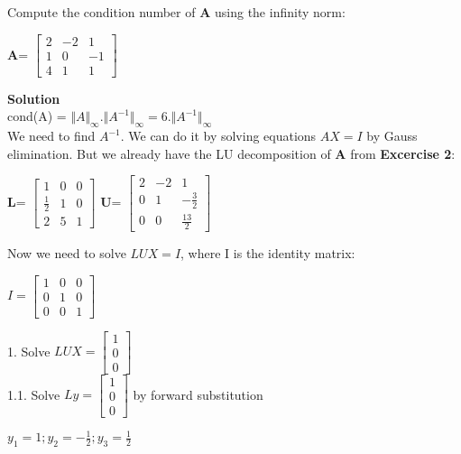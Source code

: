 \documentclass[12pt]{article}
\newenvironment{exercise}[2][Exercise]{\begin{trivlist}
\item[\hskip \labelsep {\bfseries #1}\hskip \labelsep {\bfseries #2.}]}{\end{trivlist}}
\begin{document}
\begin{exercise}{5} %
Compute the condition number of $\textbf{A}$ using the infinity norm:
\begin{center}
\textbf{A}=
$\begin{bmatrix}
2&-2&1\\
1&0&-1\\
4&1&1
\end{bmatrix}
$
\end{center}
\textbf{Solution}\\

cond(A) = $\Vert A \Vert_\infty . \Vert A^{-1} \Vert_\infty = 6 . \Vert A^{-1} \Vert_\infty$ \\
We need to find $A^{-1}$. We can do it by solving equations $AX = I$ by Gauss elimination. But we already have the LU decomposition of \textbf{A} from \textbf{Excercise 2}:
\begin{center}
\textbf{L}=
$\begin{bmatrix}
1&0&0\\
\frac{1}{2}&1&0\\
2&5&1
\end{bmatrix}
$
\textbf{U}=
$\begin{bmatrix}
2&-2&1\\
0&1&-\frac{3}{2}\\
0&0&\frac{13}{2}
\end{bmatrix}
$
\end{center}
Now we need to solve $LUX = I$, where I is the identity matrix:
\begin{center}
$ I = \begin{bmatrix}
1&0&0\\
0&1&0\\
0&0&1
\end{bmatrix}
$
\end{center}

1. Solve $LUX=\begin{bmatrix} 1\\0\\0\end{bmatrix}$\\

1.1. Solve $Ly=\begin{bmatrix} 1\\0\\0\end{bmatrix}$ by forward substitution
\begin{center}
$y_1 = 1; y_2=-\frac{1}{2};y_3=\frac{1}{2}$
\end{center}


\end{exercise}
\end{document}
